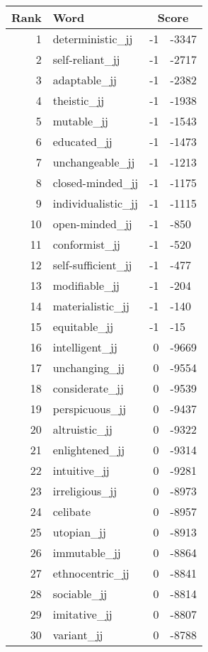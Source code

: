 \begin{longtable}[!htbp]{| rlr@{.}l |}
    \hline
    \textbf{Rank} & \textbf{Word} & \multicolumn{2}{c|}{\textbf{Score}} \\
    \hline
    \endhead
    1 & deterministic\_jj & -1 & -3347 \\
    2 & self-reliant\_jj & -1 & -2717 \\
    3 & adaptable\_jj & -1 & -2382 \\
    4 & theistic\_jj & -1 & -1938 \\
    5 & mutable\_jj & -1 & -1543 \\
    6 & educated\_jj & -1 & -1473 \\
    7 & unchangeable\_jj & -1 & -1213 \\
    8 & closed-minded\_jj & -1 & -1175 \\
    9 & individualistic\_jj & -1 & -1115 \\
    10 & open-minded\_jj & -1 & -850 \\
    11 & conformist\_jj & -1 & -520 \\
    12 & self-sufficient\_jj & -1 & -477 \\
    13 & modifiable\_jj & -1 & -204 \\
    14 & materialistic\_jj & -1 & -140 \\
    15 & equitable\_jj & -1 & -15 \\
    16 & intelligent\_jj & 0 & -9669 \\
    17 & unchanging\_jj & 0 & -9554 \\
    18 & considerate\_jj & 0 & -9539 \\
    19 & perspicuous\_jj & 0 & -9437 \\
    20 & altruistic\_jj & 0 & -9322 \\
    21 & enlightened\_jj & 0 & -9314 \\
    22 & intuitive\_jj & 0 & -9281 \\
    23 & irreligious\_jj & 0 & -8973 \\
    24 & celibate & 0 & -8957 \\
    25 & utopian\_jj & 0 & -8913 \\
    26 & immutable\_jj & 0 & -8864 \\
    27 & ethnocentric\_jj & 0 & -8841 \\
    28 & sociable\_jj & 0 & -8814 \\
    29 & imitative\_jj & 0 & -8807 \\
    30 & variant\_jj & 0 & -8788 \\

\end{longtable}
